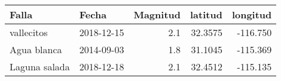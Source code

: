 \begin{tabular}{llrrr}
\toprule
        Falla &      Fecha &  Magnitud &  latitud &  longitud \\
\midrule
   vallecitos & 2018-12-15 &       2.1 &  32.3575 &  -116.750 \\
  Agua blanca & 2014-09-03 &       1.8 &  31.1045 &  -115.369 \\
Laguna salada & 2018-12-18 &       2.1 &  32.4512 &  -115.135 \\
\bottomrule
\end{tabular}
